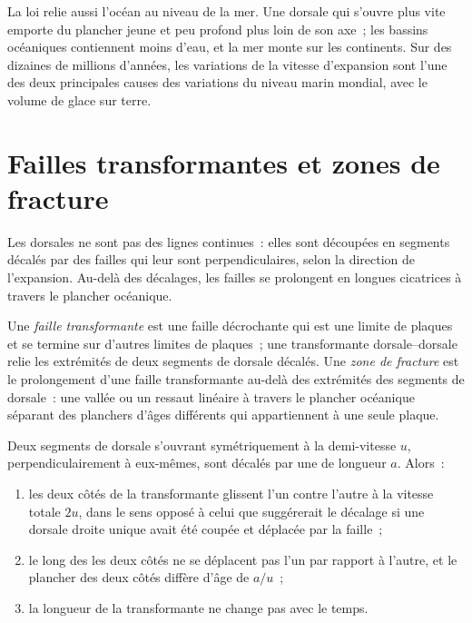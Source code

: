 La loi relie aussi l'océan au niveau de la mer. Une dorsale qui s'ouvre plus vite
emporte du plancher jeune et peu profond plus loin de son axe~; les bassins océaniques contiennent moins
d'eau, et la mer monte sur les continents. Sur des dizaines de millions d'années,
les variations de la vitesse d'expansion sont l'une des deux principales causes des variations du
niveau marin mondial, avec le volume de glace sur terre.

\section{Failles transformantes et zones de fracture}

Les dorsales ne sont pas des lignes continues~: elles sont découpées en segments décalés par des failles
qui leur sont perpendiculaires, selon la direction de l'expansion. Au-delà des décalages, les failles se prolongent en longues cicatrices
à travers le plancher océanique.

\begin{definition}\label{def:b1:rifts-ridges-margins:transform}
Une \emph{faille transformante} est une faille décrochante qui est
une limite de plaques et se termine sur d'autres limites de plaques~; une transformante
dorsale--dorsale relie les extrémités de deux segments de dorsale décalés. Une \emph{zone de
fracture} est le prolongement d'une faille transformante au-delà des
extrémités des segments de dorsale~: une vallée ou un ressaut linéaire à travers le plancher océanique
séparant des planchers d'âges différents qui appartiennent à une seule plaque.
\end{definition}

\begin{proposition}\label{prop:b1:rifts-ridges-margins:transform}
Deux segments de dorsale s'ouvrant symétriquement à la demi-vitesse $u$, perpendiculairement
à eux-mêmes, sont décalés par une  de longueur $a$. Alors~:
\begin{enumerate}
  \item les deux côtés de la transformante glissent l'un contre l'autre à la vitesse totale
        $2u$, dans le sens opposé à celui que suggérerait le décalage si une
        dorsale droite unique avait été coupée et déplacée par la faille~;
  \item le long des  les deux côtés ne se déplacent pas l'un par rapport à
        l'autre, et le plancher des deux côtés diffère d'âge de $a/u$~;
  \item la longueur de la transformante ne change pas avec le temps.
\end{enumerate}
\end{proposition}

